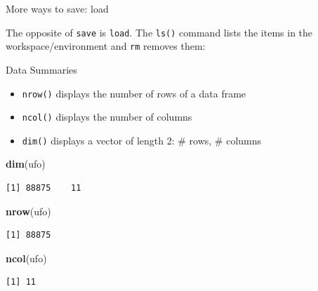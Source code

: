 \documentclass[
  ignorenonframetext,
]{beamer}
\newenvironment{Shaded}{\begin{snugshade}}{\end{snugshade}}
\newcommand{\KeywordTok}[1]{\textcolor[rgb]{0.13,0.29,0.53}{\textbf{#1}}}
\newcommand{\NormalTok}[1]{#1}
\providecommand{\tightlist}{%
  \setlength{\itemsep}{0pt}\setlength{\parskip}{0pt}}
\begin{document}
\begin{frame}[fragile]{More ways to save: load}
\protect\hypertarget{more-ways-to-save-load}{}

The opposite of \texttt{save} is \texttt{load}. The \texttt{ls()}
command lists the items in the workspace/environment and \texttt{rm}
removes them:

\end{frame}

\begin{frame}[fragile]{Data Summaries}
\protect\hypertarget{data-summaries}{}

\begin{itemize}
\tightlist
\item
  \texttt{nrow()} displays the number of rows of a data frame
\item
  \texttt{ncol()} displays the number of columns
\item
  \texttt{dim()} displays a vector of length 2: \# rows, \# columns
\end{itemize}

\begin{Shaded}
\begin{Highlighting}[]
\KeywordTok{dim}\NormalTok{(ufo)}
\end{Highlighting}
\end{Shaded}

\begin{verbatim}
[1] 88875    11
\end{verbatim}

\begin{Shaded}
\begin{Highlighting}[]
\KeywordTok{nrow}\NormalTok{(ufo)}
\end{Highlighting}
\end{Shaded}

\begin{verbatim}
[1] 88875
\end{verbatim}

\begin{Shaded}
\begin{Highlighting}[]
\KeywordTok{ncol}\NormalTok{(ufo)}
\end{Highlighting}
\end{Shaded}

\begin{verbatim}
[1] 11
\end{verbatim}

\end{frame}
\end{document}

